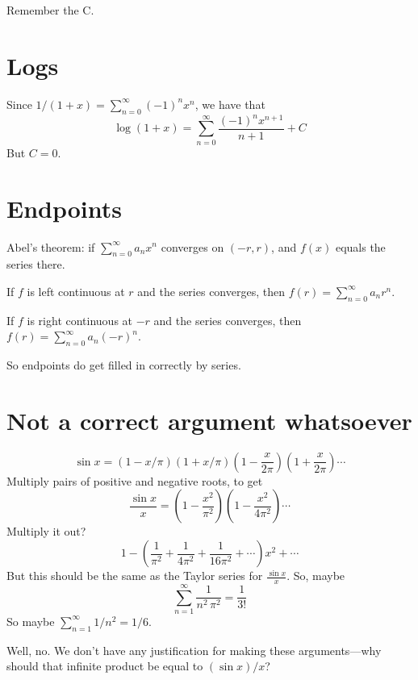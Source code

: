 \documentclass[12pt]{article}
\begin{document}
Remember the C.

\section{Logs}

Since $1/(1+x) = \sum_{n=0}^\infty (-1)^n x^n$, we have that
$$
\log (1+x) = \sum_{n=0}^\infty \frac{(-1)^n x^{n+1}}{n+1} + C
$$
But $C = 0$.

\section{Endpoints}

Abel's theorem: if $\sum_{n=0}^\infty a_n x^n$ converges on $(-r,r)$, and $f(x)$ equals the series there.

If $f$ is left continuous at $r$ and the series converges, then $f(r) = \sum_{n=0}^\infty a_n r^n$.

If $f$ is right continuous at $-r$ and the series converges, then $f(r) = \sum_{n=0}^\infty a_n (-r)^n$.

So endpoints do get filled in correctly by series.

\section{Not a correct argument whatsoever}

$$
\sin x = \left(1 - x/\pi\right) \left(1 + x/\pi\right) \left(1 - \frac{x}{2\pi}\right) \left( 1 + \frac{x}{2\pi} \right) \cdots
$$
Multiply pairs of positive and negative roots, to get
$$
\frac{\sin x}{x} = \left(1 - \frac{x^2}{\pi^2}\right) \left(1 - \frac{x^2}{4\pi^2} \right) \cdots
$$
Multiply it out?
$$
1 - \left(\frac{1}{\pi^2} + \frac{1}{4\pi^2} + \frac{1}{16\pi^2} + \cdots\right) x^2 + \cdots
$$
But this should be the same as the Taylor series for $\frac{\sin x}{x}$.  So, maybe
$$
\sum_{n=1}^\infty \frac{1}{n^2\,\pi^2} = \frac{1}{3!}
$$
So maybe $\sum_{n=1}^\infty 1/n^2 = 1/6$.

Well, no.  We don't have any justification for making these arguments---why should that infinite product be equal to $(\sin x)/x$?
\end{document}
